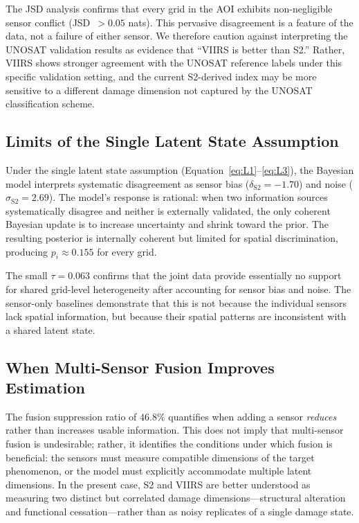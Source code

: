 \documentclass[wcp]{jmlr}
\begin{document}
The JSD analysis confirms that every grid in the AOI exhibits
non-negligible sensor conflict (JSD~$>0.05$ nats). This pervasive
disagreement is a feature of the data, not a failure of either sensor.
We therefore caution against interpreting the UNOSAT validation results
as evidence that ``VIIRS is better than S2.'' Rather, VIIRS shows stronger
agreement with the UNOSAT reference labels under this specific validation
setting, and the current S2-derived index may be more sensitive to a
different damage dimension not captured by the UNOSAT classification scheme.

\subsection{Limits of the Single Latent State Assumption}

Under the single latent state assumption (Equation~\ref{eq:L1}--\ref{eq:L3}),
the Bayesian model interprets systematic disagreement as sensor bias
($\delta_{\text{S2}}=-1.70$) and noise ($\sigma_{\text{S2}}=2.69$). The
model's response is rational: when two information sources systematically
disagree and neither is externally validated, the only coherent Bayesian
update is to increase uncertainty and shrink toward the prior. The resulting
posterior is internally coherent but limited for spatial discrimination,
producing $p_i \approx 0.155$ for every grid.

The small $\tau=0.063$ confirms that the joint data provide essentially no
support for shared grid-level heterogeneity after accounting for sensor bias
and noise. The sensor-only baselines demonstrate that this is not because
the individual sensors lack spatial information, but because their spatial
patterns are inconsistent with a shared latent state.

\subsection{When Multi-Sensor Fusion Improves Estimation}

The fusion suppression ratio of $46.8\%$ quantifies when adding a sensor
\emph{reduces} rather than increases usable information. This does not
imply that multi-sensor fusion is undesirable; rather, it identifies the
conditions under which fusion is beneficial: the sensors must measure
compatible dimensions of the target phenomenon, or the model must explicitly
accommodate multiple latent dimensions. In the present case, S2 and VIIRS
are better understood as measuring two distinct but correlated damage
dimensions---structural alteration and functional cessation---rather than
as noisy replicates of a single damage state.
\end{document}
